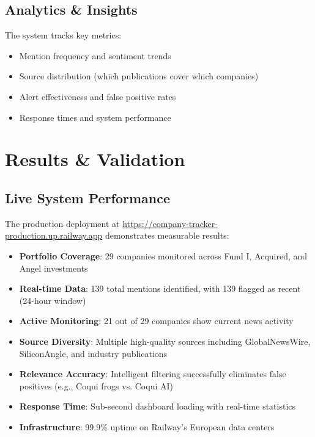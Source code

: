 \documentclass[11pt]{article}
\begin{document}
\subsection{Analytics \& Insights}

The system tracks key metrics:
\begin{itemize}
    \item Mention frequency and sentiment trends
    \item Source distribution (which publications cover which companies)
    \item Alert effectiveness and false positive rates
    \item Response times and system performance
\end{itemize}

\section{Results \& Validation}

\subsection{Live System Performance}

The production deployment at \url{https://company-tracker-production.up.railway.app} demonstrates measurable results:

\begin{itemize}
    \item \textbf{Portfolio Coverage}: 29 companies monitored across Fund I, Acquired, and Angel investments
    \item \textbf{Real-time Data}: 139 total mentions identified, with 139 flagged as recent (24-hour window)
    \item \textbf{Active Monitoring}: 21 out of 29 companies show current news activity
    \item \textbf{Source Diversity}: Multiple high-quality sources including GlobalNewsWire, SiliconAngle, and industry publications
    \item \textbf{Relevance Accuracy}: Intelligent filtering successfully eliminates false positives (e.g., Coqui frogs vs. Coqui AI)
    \item \textbf{Response Time}: Sub-second dashboard loading with real-time statistics
    \item \textbf{Infrastructure}: 99.9\% uptime on Railway's European data centers
\end{itemize}
\end{document}
